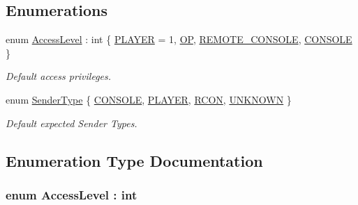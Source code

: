 \subsection*{Enumerations}
\begin{DoxyCompactItemize}
\item 
enum \hyperlink{namespaceOTA_1_1Command_a0bb463ef02a9fd3406866a98c6fc2cdc}{Access\+Level} \+: int \{ \hyperlink{namespaceOTA_1_1Command_a0bb463ef02a9fd3406866a98c6fc2cdca07c80e2a355d91402a00d82b1fa13855}{P\+L\+A\+Y\+E\+R} = 1, 
\hyperlink{namespaceOTA_1_1Command_a0bb463ef02a9fd3406866a98c6fc2cdca7457cdd15d09bfc6c4dbb5d2b6f87390}{O\+P}, 
\hyperlink{namespaceOTA_1_1Command_a0bb463ef02a9fd3406866a98c6fc2cdca2f76a17583676d1e769f74885a5bd411}{R\+E\+M\+O\+T\+E\+\_\+\+C\+O\+N\+S\+O\+L\+E}, 
\hyperlink{namespaceOTA_1_1Command_a0bb463ef02a9fd3406866a98c6fc2cdca4695859f52d337ca3d7020b2c8f7882a}{C\+O\+N\+S\+O\+L\+E}
 \}\begin{DoxyCompactList}\small\item\em Default access privileges. \end{DoxyCompactList}
\item 
enum \hyperlink{namespaceOTA_1_1Command_ab957a14a33aecd4b104f6e4992efd342}{Sender\+Type} \{ \hyperlink{namespaceOTA_1_1Command_ab957a14a33aecd4b104f6e4992efd342a4695859f52d337ca3d7020b2c8f7882a}{C\+O\+N\+S\+O\+L\+E}, 
\hyperlink{namespaceOTA_1_1Command_ab957a14a33aecd4b104f6e4992efd342a07c80e2a355d91402a00d82b1fa13855}{P\+L\+A\+Y\+E\+R}, 
\hyperlink{namespaceOTA_1_1Command_ab957a14a33aecd4b104f6e4992efd342af2d3ec013c88e111064483739a50a7f4}{R\+C\+O\+N}, 
\hyperlink{namespaceOTA_1_1Command_ab957a14a33aecd4b104f6e4992efd342a696b031073e74bf2cb98e5ef201d4aa3}{U\+N\+K\+N\+O\+W\+N}
 \}\begin{DoxyCompactList}\small\item\em Default expected Sender Types. \end{DoxyCompactList}
\end{DoxyCompactItemize}


\subsection{Enumeration Type Documentation}
\hypertarget{namespaceOTA_1_1Command_a0bb463ef02a9fd3406866a98c6fc2cdc}{}
\subsubsection[{Access\+Level}]{\setlength{\rightskip}{0pt plus 5cm}enum {\bf Access\+Level} \+: int\hspace{0.3cm}{\ttfamily [strong]}}\label{namespaceOTA_1_1Command_a0bb463ef02a9fd3406866a98c6fc2cdc}


